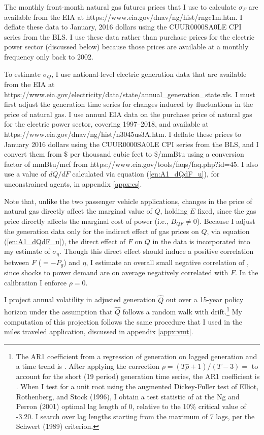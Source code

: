 \documentclass[12pt]{article}
\begin{document}
The monthly front-month natural gas futures prices that I use to calculate $\sigma_F$ are available from the EIA at https://www.eia.gov/dnav/ng/hist/rngc1m.htm. I deflate these data to January, 2016 dollars using the CUUR0000SA0LE CPI series from the BLS. I use these data rather than purchase prices for the electric power sector (discussed below) because those prices are available at a monthly frequency only back to 2002.

To estimate $\sigma_Q$, I use national-level electric generation data that are available from the EIA at https://www.eia.gov/electricity/data/state/annual\_generation\_state.xls. I must first adjust the generation time series for changes induced by fluctuations in the price of natural gas. I use annual EIA data on the purchase price of natural gas for the electric power sector, covering 1997--2018, and available at https://www.eia.gov/dnav/ng/hist/n3045us3A.htm. I deflate these prices to January 2016 dollars using the CUUR0000SA0LE CPI series from the BLS, and I convert them from \$ per thousand cubic feet to \$/mmBtu using a conversion factor of mmBtu/mcf from https://www.eia.gov/tools/faqs/faq.php?id=45. I also use a value of $dQ/dF$ calculated via equation (\ref{en:A1_dQdF_u}), for unconstrained agents, in appendix \ref{appx:cs}. 

Note that, unlike the two passenger vehicle applications, changes in the price of natural gas directly affect the marginal value of $Q$, holding $E$ fixed, since the gas price directly affects the marginal cost of power (i.e., $B_{QF}\neq0$). Because I adjust the generation data only for the indirect effect of gas prices on $Q$, via equation (\ref{en:A1_dQdF_u}), the direct effect of $F$ on $Q$ in the data is incorporated into my estimate of $\sigma_\eta$. Though this direct effect should induce a positive correlation between $F$ ($=-P_g$) and $\eta$, I estimate an overall small negative correlation of \unskip, since shocks to power demand are on average negatively correlated with $F$. In the calibration I enforce $\rho=0$.

I project annual volatility in adjusted generation $\hat{Q}$ out over a 15-year policy horizon under the assumption that $\hat{Q}$ follows a random walk with drift.\footnote{The AR1 coefficient from a regression of generation on lagged generation and a time trend is \unskip. After applying the correction $\rho = (T\hat{\rho}+1)/(T-3)=$ to account for the short (19 period) generation time series, the AR1 coefficient is \unskip. When I test for a unit root using the augmented Dickey-Fuller test of Elliot, Rothenberg, and Stock (1996), I obtain a test statistic of at the Ng and Perron (2001) optimal lag length of 0, relative to the 10\% critical value of -3.20. I search over lag lengths starting from the maximum of 7 lags, per the Schwert (1989) criterion.} My computation of this projection follows the same procedure that I used in the miles traveled application, discussed in appendix \ref{appx:vmt}.
\end{document}
